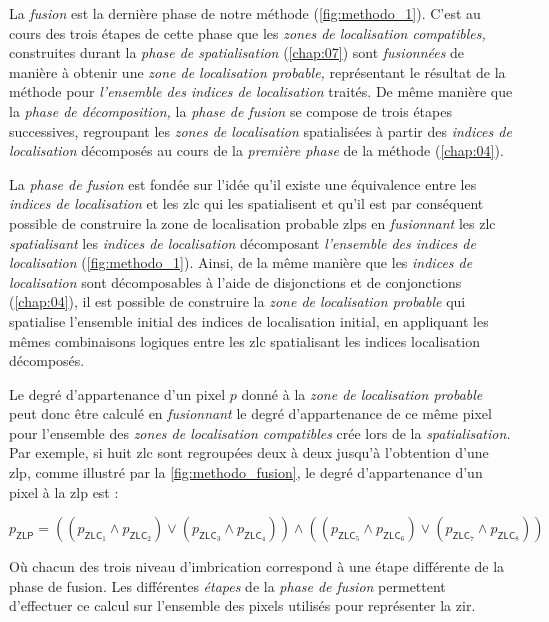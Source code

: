 La \emph{fusion} est la dernière phase de notre méthode
(\autoref{fig:methodo_1}). C'est au cours des trois étapes de cette
phase que les \emph{zones de localisation compatibles,} construites
durant la \emph{phase de spatialisation} (\autoref{chap:07}) sont
\emph{fusionnées} de manière à obtenir une \emph{zone de localisation
  probable,} représentant le résultat de la méthode pour
\emph{l'ensemble des indices de localisation} traités. De même manière
que la \emph{phase de décomposition,} la \emph{phase de fusion} se
compose de trois étapes successives, regroupant les \emph{zones de
  localisation} spatialisées à partir des \emph{indices de
  localisation} décomposés au cours de la \emph{première phase} de la
méthode (\autoref{chap:04}).

La \emph{phase de fusion} est fondée sur l'idée qu'il existe une
équivalence entre les \emph{indices de localisation} et les \ac{zlc}
qui les spatialisent et qu'il est par conséquent possible de
construire la zone de localisation probable \acp{zlp} en
\emph{fusionnant} les \ac{zlc} \emph{spatialisant} les \emph{indices
  de localisation} décomposant \emph{l'ensemble des indices de
  localisation} (\autoref{fig:methodo_1}). Ainsi, de la même manière
que les \emph{indices de localisation} sont décomposables à l'aide de
disjonctions et de conjonctions (\autoref{chap:04}), il est possible
de construire la \emph{zone de localisation probable} qui spatialise
l'ensemble initial des indices de localisation initial, en appliquant
les mêmes combinaisons logiques entre les \ac{zlc} spatialisant les
indices localisation décomposés.

Le degré d'appartenance d'un pixel \(p\) donné à la \emph{zone de
  localisation probable} peut donc être calculé en \emph{fusionnant}
le degré d'appartenance de ce même pixel pour l'ensemble des
\emph{zones de localisation compatibles} crée lors de la
\emph{spatialisation.} Par exemple, si huit \ac{zlc} sont regroupées
deux à deux jusqu'à l'obtention d'une \ac{zlp}, comme illustré par la
\autoref{fig:methodo_fusion}, le degré d'appartenance d'un pixel à la
\ac{zlp} est :

\begin{equation}
 p_{\mathsf{ZLP}} = \left((p_{\mathsf{ZLC}_1} \wedge
p_{\mathsf{ZLC}_2}) \vee (p_{\mathsf{ZLC}_3} \wedge
p_{\mathsf{ZLC}_4})\right) \wedge \left((p_{\mathsf{ZLC}_5} \wedge
p_{\mathsf{ZLC}_6}) \vee (p_{\mathsf{ZLC}_7} \wedge
p_{\mathsf{ZLC}_8})\right)
\end{equation}

Où chacun des trois niveau d'imbrication correspond à une étape
différente de la phase de fusion. Les différentes \emph{étapes} de la
\emph{phase de fusion} permettent d'effectuer ce calcul sur l'ensemble
des pixels utilisés pour représenter la \ac{zir}.

